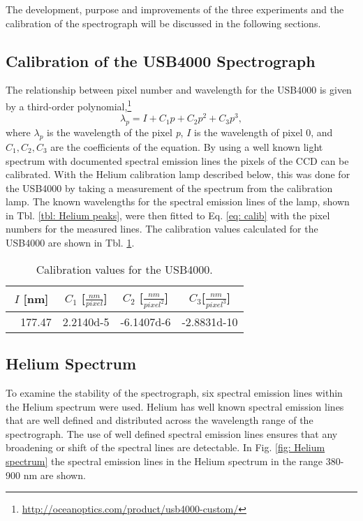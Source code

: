 The development, purpose and improvements of the three experiments and the calibration of the spectrograph will be discussed in the following sections.

\subsection{Calibration of the USB4000 Spectrograph}
The relationship between pixel number and wavelength for the USB4000 is given by a third-order polynomial,\footnote{\url{http://oceanoptics.com/product/usb4000-custom/}}
\begin{equation}
 \lambda _p = I +C_1p + C_2 p^2 + C_3 p^3  ,
 \label{eq: calib}
\end{equation}
where $\lambda_p$ is the wavelength of the pixel \emph{p}, $I$ is the wavelength of pixel 0, and $C_1,C_2,C_3$ are the coefficients of the equation. By using a well known light spectrum with documented spectral emission lines the pixels of the CCD can be calibrated. With the Helium calibration lamp described below, this was done for the USB4000 by taking a measurement of the spectrum from the calibration lamp. The known wavelengths for the spectral emission lines of the lamp, shown in Tbl. \ref{tbl: Helium peaks}, were then fitted to Eq. \ref{eq: calib} with the pixel numbers for the measured lines. The calibration values calculated for the USB4000 are shown in Tbl. \ref{tbl: calib}.

\begin{table}[h]
\centering
    \begin{tabular}{cccc}
    \hline
    $I$ [nm]& $C_1$ [$\frac{nm}{pixel}$]& $C_2$ [$\frac{nm}{pixel^2}$]& $C_3$[$\frac{nm}{pixel^3}$] \\ \hline
    ~
    177.47  & \num{2.2140d-5}    & \num{-6.1407d-6}    & \num{-2.8831d-10}    \\ \hline
    \end{tabular}
    \caption{Calibration values for the USB4000.}
    \label{tbl: calib}
\end{table}

\subsection{Helium Spectrum}
\label{sec: Helium}
To examine the stability of the spectrograph, six spectral emission lines within the Helium spectrum were used. Helium has well known spectral emission lines that are well defined and distributed across the wavelength range of the spectrograph. The use of well defined spectral emission lines ensures that any broadening or shift of the spectral lines are detectable. In Fig. \ref{fig: Helium spectrum} the spectral emission lines in the Helium spectrum in the range 380-900 nm are shown.

